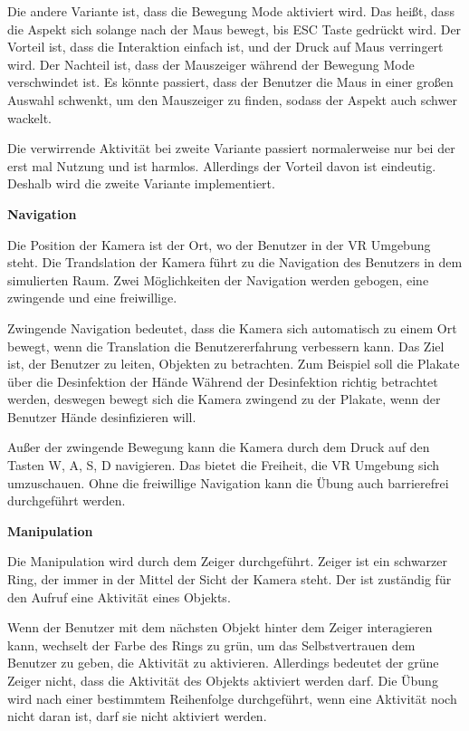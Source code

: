   Die andere Variante ist, dass die Bewegung Mode aktiviert wird. Das heißt, dass die Aspekt sich solange nach der Maus bewegt, bis ESC Taste gedrückt wird. Der Vorteil ist, dass die Interaktion einfach ist, und der Druck auf Maus verringert wird. Der Nachteil ist, dass der Mauszeiger während der Bewegung Mode verschwindet ist. Es könnte passiert, dass der Benutzer die Maus in einer großen Auswahl schwenkt, um den Mauszeiger zu finden, sodass der Aspekt auch schwer wackelt.
  
  Die verwirrende Aktivität bei zweite Variante passiert normalerweise nur bei der erst mal Nutzung und ist harmlos. Allerdings der Vorteil davon ist eindeutig. Deshalb wird die zweite Variante implementiert.
  
  \textbf{Navigation}
  
  Die Position der Kamera ist der Ort, wo der Benutzer in der VR Umgebung steht. Die Trandslation der Kamera führt zu die Navigation des Benutzers in dem simulierten Raum. Zwei Möglichkeiten der Navigation werden gebogen, eine zwingende und eine freiwillige.
  
  Zwingende Navigation bedeutet, dass die Kamera sich automatisch zu einem Ort bewegt, wenn die Translation die Benutzererfahrung verbessern kann. Das Ziel ist, der Benutzer zu leiten, Objekten zu betrachten. Zum Beispiel soll die Plakate über die Desinfektion der Hände Während der Desinfektion richtig betrachtet werden, deswegen bewegt sich die Kamera zwingend zu der Plakate, wenn der Benutzer Hände desinfizieren will.

  Außer der zwingende Bewegung kann die Kamera durch dem Druck auf den Tasten W, A, S, D navigieren. Das bietet die Freiheit, die VR Umgebung sich umzuschauen. Ohne die freiwillige Navigation kann die Übung auch barrierefrei durchgeführt werden.
  
  \textbf{Manipulation}
  
  Die Manipulation wird durch dem Zeiger durchgeführt. Zeiger ist ein schwarzer Ring, der immer in der Mittel der Sicht der Kamera steht. Der ist zuständig für den Aufruf eine Aktivität eines Objekts.
  
  Wenn der Benutzer mit dem nächsten Objekt hinter dem Zeiger interagieren kann, wechselt der Farbe des Rings zu grün, um das Selbstvertrauen dem Benutzer zu geben, die Aktivität zu aktivieren. Allerdings bedeutet der grüne Zeiger nicht, dass die Aktivität des Objekts aktiviert werden darf. Die Übung wird nach einer bestimmtem Reihenfolge durchgeführt, wenn eine Aktivität noch nicht daran ist, darf sie nicht aktiviert werden.
  
